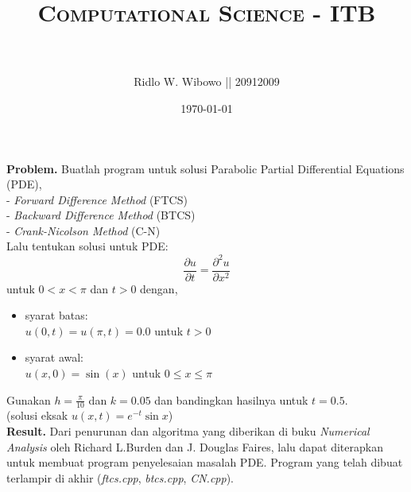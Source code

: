 \documentclass[paper=a4, fontsize=11pt]{scrartcl}
\title{	
\normalfont \normalsize 
\textsc{Computational Science - ITB} \\ [25pt] %
\horrule{0.5pt} \\[0.4cm] %
}
\author{\small{Ridlo W. Wibowo || 20912009}} %
\date{\normalsize\today} %
\numberwithin{equation}{section} %
\numberwithin{figure}{section} %
\numberwithin{table}{section} %
\begin{document}
\maketitle %

\large \textbf{Problem.}
Buatlah program untuk solusi Parabolic Partial Differential Equations (PDE),\\
- \textit{Forward Difference Method} (FTCS)\\ 
- \textit{Backward Difference Method} (BTCS)\\
- \textit{Crank-Nicolson Method} (C-N)\\
Lalu tentukan solusi untuk PDE:\\
\begin{equation}
\frac{\partial u}{\partial t} = \frac{\partial ^{2}u}{\partial x^{2}}
\end{equation}
untuk $0 < x < \pi$ dan $t > 0$ dengan,
\begin{itemize}
\item syarat batas:\\
$u(0, t) = u(\pi, t) = 0.0$ untuk $t > 0$\\
\item syarat awal:\\
$u(x,0) = \sin(x)$ untuk  $0 \leq x \leq \pi$\\ 
\end{itemize}
Gunakan $h=\frac{\pi}{10}$ dan $k=0.05$ dan bandingkan hasilnya untuk $t = 0.5$.\\
(solusi eksak $u(x, t) = e^{-t}\sin{x}$)\\


\newpage
\large \textbf{Result.}
Dari penurunan dan algoritma yang diberikan di buku \textit{Numerical Analysis} oleh Richard L.Burden dan J. Douglas Faires, lalu dapat diterapkan untuk membuat program penyelesaian masalah PDE. Program yang telah dibuat terlampir di akhir (\textit{ftcs.cpp}, \textit{btcs.cpp}, \textit{CN.cpp}).\\
\end{document}
